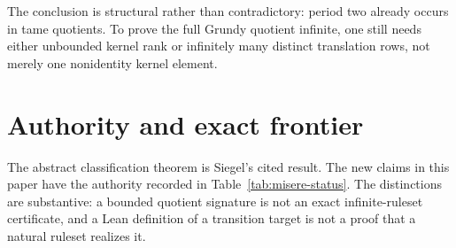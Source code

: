 \documentclass[11pt]{article}
\theoremstyle{definition}
\theoremstyle{remark}
\begin{document}
The conclusion is structural rather than contradictory: period two already
occurs in tame quotients.  To prove the full Grundy quotient infinite, one
still needs either unbounded kernel rank or infinitely many distinct
translation rows, not merely one nonidentity kernel element.

\section{Authority and exact frontier}\label{sec:boundary}

The abstract classification theorem is Siegel's cited result.  The new claims
in this paper have the authority recorded in Table~\ref{tab:misere-status}.
The distinctions are substantive: a bounded quotient signature is not an
exact infinite-ruleset certificate, and a Lean definition of a transition
target is not a proof that a natural ruleset realizes it.
\end{document}
